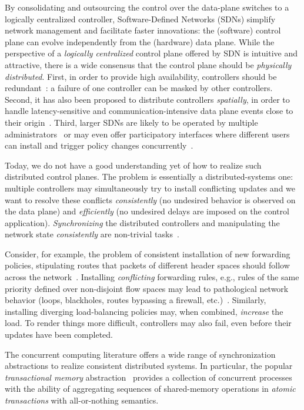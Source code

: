 \documentclass[conference]{sigcomm-alternate}
\begin{document}
By consolidating and outsourcing the control over the data-plane switches to a logically
centralized controller, Software-Defined Networks (SDNs)
simplify network management and facilitate faster innovations:
the (software) control plane can evolve independently from the
(hardware) data plane.
While the perspective of a \emph{logically centralized} control plane
offered by SDN is intuitive and attractive,
there is a wide consensus that
the control plane should be  \emph{physically distributed}.
First, in order to provide high availability,
controllers should be redundant~\cite{onix,onos,elasticon}: a failure
of one controller can be masked by other controllers.
Second, it has also been proposed to distribute controllers \emph{spatially}, in order to handle latency-sensitive and
communication-intensive
data plane
events close to their origin~\cite{devoflow,kandoo}.
Third, larger SDNs are likely to be operated by multiple administrators~\cite{stn} or may even offer
participatory interfaces where different users can install and trigger policy changes
concurrently~\cite{participatory}.

Today, we do not have a good understanding yet of how to realize
such distributed control planes. The problem is essentially a
distributed-systems
one: multiple controllers may simultaneously try to
install conflicting updates and we want to resolve these conflicts
\emph{consistently} (no undesired behavior is observed on the data
plane) and \emph{efficiently} (no undesired delays are imposed on the
control application).
\emph{Synchronizing}
the distributed controllers and manipulating the network state \emph{consistently}
are non-trivial tasks~\cite{sharon}.

Consider, for example, the problem of
consistent installation of new forwarding policies, stipulating routes
that packets of different header spaces should follow across the
network~\cite{network-update,roger-hotnets,podc15}.
Installing \emph{conflicting} forwarding rules, e.g., rules of the same priority defined over non-disjoint
flow spaces may lead to pathological network behavior (loops,
blackholes, routes bypassing a firewall, etc.)~\cite{hotnets14update,roger-hotnets}.
Similarly, installing diverging load-balancing policies may,
when combined, \emph{increase} the load.
To render things more difficult, controllers may also fail,
even before their updates have been completed.

The concurrent computing literature offers
a wide range of synchronization abstractions
to realize consistent distributed systems.
In particular, the popular 
\emph{transactional  memory} abstraction~\cite{HM93,stm-st95,tm-book} 
provides a
collection of
concurrent processes with the ability of aggregating sequences of
shared-memory operations in \emph{atomic  transactions} with
all-or-nothing semantics.
\end{document}
